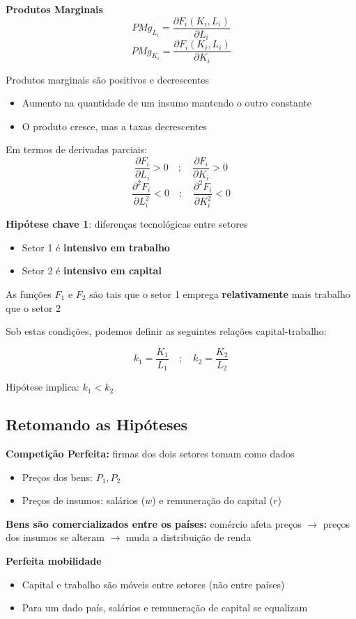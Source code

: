 \documentclass[a4paper,12pt]{article}[abntex2]
\begin{document}
\textbf{Produtos Marginais}
\[
PMg_{L_i} = \frac{\partial F_i(K_i, L_i)}{\partial L_i}
\]
\[
PMg_{K_i} = \frac{\partial F_i(K_i, L_i)}{\partial K_i}
\]

Produtos marginais são positivos e decrescentes\begin{itemize}
    \item Aumento na quantidade de um insumo mantendo o outro constante
    \item O produto cresce, mas a taxas decrescentes
\end{itemize}

Em termos de derivadas parciais:
\[
\frac{\partial F_i}{\partial L_i} > 0 \quad ; \quad \frac{\partial F_i}{\partial K_i} > 0
\]
\[
\frac{\partial^2 F_i}{\partial L_i^2} < 0 \quad ; \quad \frac{\partial^2 F_i}{\partial K_i^2} < 0
\]

\textbf{Hipótese chave 1}: diferenças tecnológicas entre setores\begin{itemize}
    \item  Setor 1 é \textbf{intensivo em trabalho}
    \item  Setor 2 é \textbf{intensivo em capital}
\end{itemize}

As funções \(F_1\) e \(F_2\) são tais que o setor 1 emprega \textbf{relativamente} mais trabalho que o setor 2

Sob estas condições, podemos definir as seguintes relações capital-trabalho:

\[
k_1 = \frac{K_1}{L_1} \quad ; \quad k_2 = \frac{K_2}{L_2}
\]

Hipótese implica: \( k_1 < k_2 \)


\subsection{\textbf{Retomando as Hipóteses}}
\textbf{Competição Perfeita:} firmas dos dois setores tomam como dados\begin{itemize}
    \item Preços dos bens: \( P_1, P_2 \)
    \item Preços de insumos: salários (\( w \)) e remuneração do capital (\( r \))
\end{itemize}

\textbf{Bens são comercializados entre os países:} comércio afeta preços \(\rightarrow\) preços dos insumos se alteram \(\rightarrow\) muda a distribuição de renda

\textbf{Perfeita mobilidade}\begin{itemize}
    \item Capital e trabalho são móveis entre setores (não entre países)
    \item Para um dado país, salários e remuneração de capital se equalizam
\end{itemize}
\end{document}
